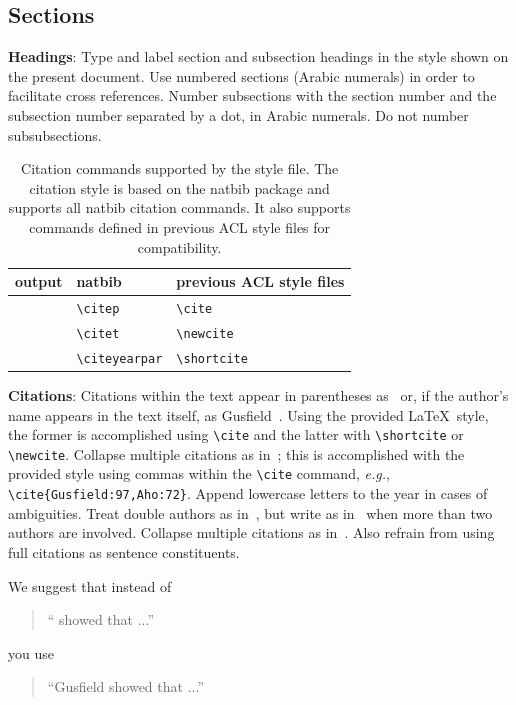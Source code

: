\documentclass[11pt,a4paper]{article}
\begin{document}
\subsection{Sections}

{\bf Headings}: Type and label section and subsection headings in the
style shown on the present document.  Use numbered sections (Arabic
numerals) in order to facilitate cross references. Number subsections
with the section number and the subsection number separated by a dot,
in Arabic numerals.
Do not number subsubsections.

\begin{table}[t!]
\centering
\begin{tabular}{lll}
  output & natbib & previous ACL style files\\
  \hline
  \citep{Gusfield:97} & \verb|\citep| & \verb|\cite| \\
  \citet{Gusfield:97} & \verb|\citet| & \verb|\newcite| \\
  \citeyearpar{Gusfield:97} & \verb|\citeyearpar| & \verb|\shortcite| \\
\end{tabular}
\caption{Citation commands supported by the style file.
  The citation style is based on the natbib package and
  supports all natbib citation commands.
  It also supports commands defined in previous ACL style files
  for compatibility.
  }
\end{table}

{\bf Citations}: Citations within the text appear in parentheses
as~\cite{Gusfield:97} or, if the author's name appears in the text
itself, as Gusfield~.
Using the provided \LaTeX\ style, the former is accomplished using
{\small\verb|\cite|} and the latter with {\small\verb|\shortcite|} or {\small\verb|\newcite|}. Collapse multiple citations as in~\cite{Gusfield:97,Aho:72}; this is accomplished with the provided style using commas within the {\small\verb|\cite|} command, {\em e.g.}, {\small\verb|\cite{Gusfield:97,Aho:72}|}. Append lowercase letters to the year in cases of ambiguities.  
 Treat double authors as
in~\cite{Aho:72}, but write as in~\cite{Chandra:81} when more than two
authors are involved. Collapse multiple citations as
in~\cite{Gusfield:97,Aho:72}. Also refrain from using full citations
as sentence constituents.

We suggest that instead of
\begin{quote}
  ``\cite{Gusfield:97} showed that ...''
\end{quote}
you use
\begin{quote}
``Gusfield    showed that ...''
\end{quote}
\end{document}
